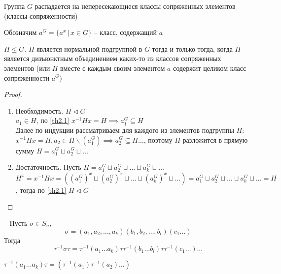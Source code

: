 \begin{corollary}
    Группа $G$ распадается на непересекающиеся классы сопряженных элементов (классы сопряженности)
\end{corollary}


\begin{definition}
    Обозначим $a^G = \{a^x \,|\, x \in G\}$ -- класс, содержащий $a$
\end{definition}

\begin{proposition}
    \label{pr2.1}
    $H \leq G$. $H$ является нормальной подгруппой в $G$ тогда и только тогда, когда $H$ является дизъюнктным объединением каких-то из классов сопряженных элементов (или $H$ вместе с каждым своим элементом $a$ содержит целиком класс сопряженности $a^G$)
\end{proposition}

\begin{proof}~
    \begin{enumerate}
        \item Необходимость. $H \lhd G$ \\
    $a_1 \in H$, по \ref{th2.1} $x^{-1}Hx = H \implies a_{1}^G \subseteq H$ \\
    Далее по индукции рассматриваем для каждого из элементов подгруппы $H$: $x^{-1}Hx = H, a_2 \in H \backslash (a_{1}^G) \implies a_{2}^G \subseteq H \dots$, поэтому $H$ разложится в прямую сумму $H = a_{1}^G \sqcup a_{2}^G \sqcup \ldots$
        \item Достаточность. Пусть $H = a_{1}^G \sqcup a_{2}^G \sqcup \ldots \sqcup a_{k}^G \sqcup \ldots$ \\
    $H^x = x^{-1}Hx = ((a_{1}^G)^x \sqcup (a_{2}^G)^x \sqcup \ldots \sqcup (a_{k}^G)^x \sqcup \ldots) = a_{1}^G \sqcup a_{2}^G \sqcup \ldots \sqcup a_{k}^G \sqcup \ldots = H$, тогда по \ref{th2.1} $H \lhd G$
    \end{enumerate}
\end{proof}

\begin{example}~
    Пусть $\sigma \in S_n$, $$\sigma = (a_1, a_2, \ldots, a_k)(b_1, b_2, \ldots, b_l)(c_1 \ldots)$$ 
    Тогда $$\tau^{-1} \sigma \tau = \tau^{-1} (a_1 \ldots a_k) \tau \tau^{-1} (b_1 \ldots b_l) \tau \tau^{-1}(c_1 \ldots) \ldots$$
\end{example}

\begin{proposition}
    $\tau^{-1} (a_1 \ldots a_k) \tau = (\tau^{-1}(a_1) \tau^{-1}(a_2) \ldots)$
\end{proposition}

